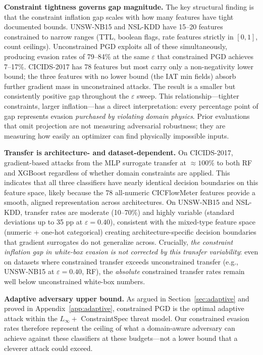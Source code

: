 \documentclass[sigconf,anonymous=true]{acmart}
\begin{document}
\textbf{Constraint tightness governs gap magnitude.}
The key structural finding is that the constraint inflation gap scales
with how many features have tight documented bounds.
UNSW-NB15 and NSL-KDD have 15--20 features constrained to narrow
ranges (TTL, boolean flags, rate features strictly in $[0,1]$, count
ceilings).  Unconstrained PGD exploits all of these simultaneously,
producing evasion rates of 79--84\% at the same $\varepsilon$ that
constrained PGD achieves 7--17\%.
CICIDS-2017 has 78 features but most carry only a non-negativity
lower bound; the three features with no lower bound (the IAT min
fields) absorb further gradient mass in unconstrained attacks.
The result is a smaller but consistently positive gap throughout the
$\varepsilon$ sweep.
This relationship---tighter constraints, larger inflation---has a direct
interpretation: every percentage point of gap represents evasion
\emph{purchased by violating domain physics}.  Prior evaluations that
omit projection are not measuring adversarial robustness; they are
measuring how easily an optimizer can find physically impossible inputs.

\textbf{Transfer is architecture- and dataset-dependent.}
On CICIDS-2017, gradient-based attacks from the MLP surrogate
transfer at $\approx\!100\%$ to both RF and XGBoost regardless of
whether domain constraints are applied.
This indicates that all three classifiers have nearly identical decision
boundaries on this feature space, likely because the 78 all-numeric
CICFlowMeter features provide a smooth, aligned representation across
architectures.
On UNSW-NB15 and NSL-KDD, transfer rates are moderate (10--70\%) and
highly variable (standard deviations up to 35 pp at $\varepsilon=0.40$),
consistent with the mixed-type feature space (numeric + one-hot
categorical) creating architecture-specific decision boundaries that
gradient surrogates do not generalize across.
Crucially, \emph{the constraint inflation gap in white-box evasion is
not corrected by this transfer variability}: even on datasets where
constrained transfer exceeds unconstrained transfer (e.g., UNSW-NB15 at
$\varepsilon=0.40$, RF), the \emph{absolute} constrained transfer rates
remain well below unconstrained white-box numbers.

\textbf{Adaptive adversary upper bound.}
As argued in Section~\ref{sec:adaptive} and proved in
Appendix~\ref{app:adaptive}, constrained PGD is the optimal
adaptive attack within the $L_\infty +$ ConstraintSpec threat model.
Our constrained evasion rates therefore represent the ceiling of what a
domain-aware adversary can achieve against these classifiers at these
budgets---not a lower bound that a cleverer attack could exceed.
\end{document}
